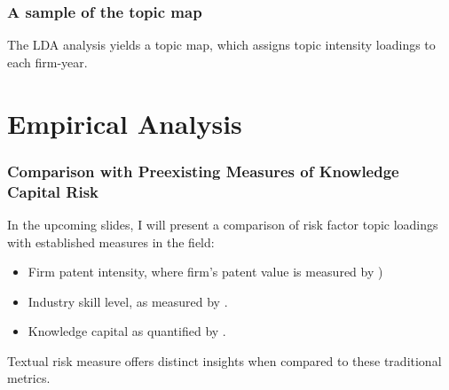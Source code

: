 \documentclass{beamer}
\newcommand{\ffo}{dicfullmc10thr10defnob40noa1_4t}
\begin{document}


\begin{frame}
  \frametitle{A sample of the topic map}
The LDA analysis yields a topic map, which assigns topic intensity loadings to each firm-year.
   \tiny
  
\end{frame}


\section{Empirical Analysis}

\begin{frame}
  \frametitle{Comparison with Preexisting Measures of Knowledge Capital Risk}
  In the upcoming slides, I will present a comparison of risk factor topic loadings with established measures in the field:
  \begin{itemize}
    \item Firm patent intensity, where firm's patent value is measured by \cite{Kogan2017-fx}) 
    \item Industry skill level, as measured by \cite{Belo2017-qi}. 
    \item Knowledge capital as quantified by \cite{Peters2017-fl}.
  \end{itemize}
  Textual risk measure offers distinct insights when compared to these traditional metrics.
\end{frame}
\end{document}
